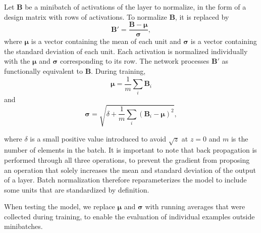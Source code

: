 Let $\mathbf{B}$ be a minibatch of activations of the layer to normalize, in the form of a design matrix with rows of activations. To normalize $\mathbf{B}$, it is replaced by
\begin{equation}
    \mathbf{B}' = \frac{\mathbf{B} - \boldsymbol{\mu}}{\boldsymbol{\sigma}},
\end{equation}
where $\boldsymbol{\mu}$ is a vector containing the mean of each unit and $\boldsymbol{\sigma}$ is a vector containing the standard deviation of each unit. Each activation is normalized individually with the $\boldsymbol{\mu}$ and $\boldsymbol{\sigma}$ corresponding to its row. The network processes $\mathbf{B}'$ as functionally equivalent to $\mathbf{B}$. During training,
\begin{equation}
    \boldsymbol{\mu} = \frac{1}{m}\sum_i \mathbf{B}_i
\end{equation}
and
\begin{equation}
    \boldsymbol{\sigma} = \sqrt{\delta + \frac{1}{m} \sum_i (\mathbf{B}_i - \boldsymbol{\mu})^2},
\end{equation}

where $\delta$ is a small positive value introduced to avoid $\sqrt{z}$ at $z = 0$ and $m$ is the number of elements in the batch. It is important to note that back propagation is performed through all three operations, to prevent the gradient from proposing an operation that solely increases the mean and standard deviation of the output of a layer. Batch normalization therefore reparameterizes the model to include some units that are standardized by definition.

When testing the model, we replace $\boldsymbol{\mu}$ and $\boldsymbol{\sigma}$ with running averages that were collected during training, to enable the evaluation of individual examples outside minibatches.

